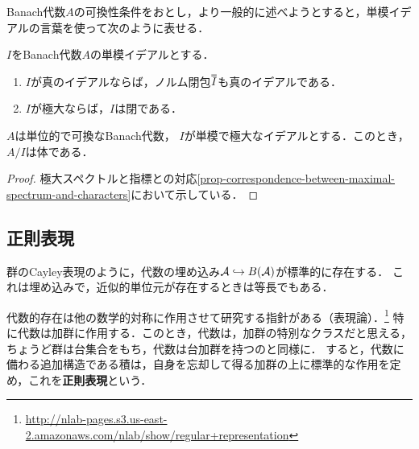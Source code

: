 \documentclass[uplatex,dvipdfmx]{jsreport}
\begin{document}
Banach代数$A$の可換性条件をおとし，より一般的に述べようとすると，単模イデアルの言葉を使って次のように表せる．

\begin{theorem}
    $I$をBanach代数$A$の単模イデアルとする．
    \begin{enumerate}
        \item $I$が真のイデアルならば，ノルム閉包$\oo{I}$も真のイデアルである．
        \item $I$が極大ならば，$I$は閉である．
    \end{enumerate}
\end{theorem}

\begin{lemma}
    $A$は単位的で可換なBanach代数，
    $I$が単模で極大なイデアルとする．このとき，$A/I$は体である．
\end{lemma}
\begin{proof}
    極大スペクトルと指標との対応\ref{prop-correspondence-between-maximal-spectrum-and-characters}において示している．
\end{proof}

\subsection{正則表現}

\begin{tcolorbox}[colframe=ForestGreen, colback=ForestGreen!10!white,breakable,colbacktitle=ForestGreen!40!white,coltitle=black,fonttitle=\bfseries\sffamily,
title=]
    群のCayley表現のように，代数の埋め込み$\mathcal{A}\hookrightarrow B(\mathcal{A})$が標準的に存在する．
    これは埋め込みで，近似的単位元が存在するときは等長でもある．

    代数的存在は他の数学的対称に作用させて研究する指針がある（表現論）．\footnote{\url{http://nlab-pages.s3.us-east-2.amazonaws.com/nlab/show/regular+representation}}
    特に代数は加群に作用する．このとき，代数は，加群の特別なクラスだと思える，ちょうど群は台集合をもち，代数は台加群を持つのと同様に．
    すると，代数に備わる追加構造である積は，自身を忘却して得る加群の上に標準的な作用を定め，これを\textbf{正則表現}という．
\end{tcolorbox}
\end{document}
